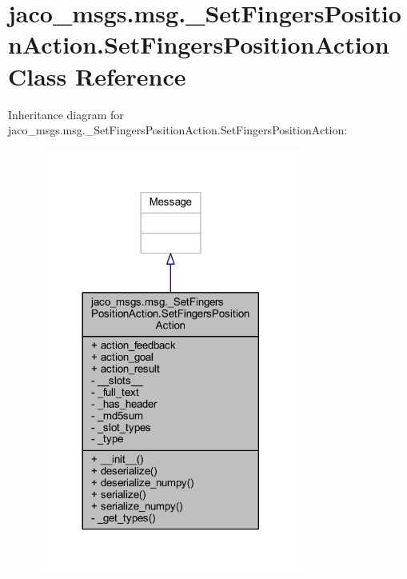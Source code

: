 \hypertarget{classjaco__msgs_1_1msg_1_1__SetFingersPositionAction_1_1SetFingersPositionAction}{}\section{jaco\+\_\+msgs.\+msg.\+\_\+\+Set\+Fingers\+Position\+Action.\+Set\+Fingers\+Position\+Action Class Reference}
\label{classjaco__msgs_1_1msg_1_1__SetFingersPositionAction_1_1SetFingersPositionAction}


Inheritance diagram for jaco\+\_\+msgs.\+msg.\+\_\+\+Set\+Fingers\+Position\+Action.\+Set\+Fingers\+Position\+Action\+:
\nopagebreak
\begin{figure}[H]
\begin{center}
\leavevmode
\includegraphics[width=245pt]{d7/d7c/classjaco__msgs_1_1msg_1_1__SetFingersPositionAction_1_1SetFingersPositionAction__inherit__graph}
\end{center}
\end{figure}


